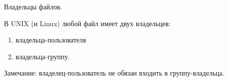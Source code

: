 \begin{frame}[fragile]{Владельцы файлов.}

  В UNIX (и Linux) любой файл имеет двух владельцев:
  \begin{enumerate}
    \item владельца-пользователя
    \item владельца-группу.
  \end{enumerate} 
   
  \small{Замечание: владелец-пользователь не обязан входить в группу-владельца.}

\end{frame}
